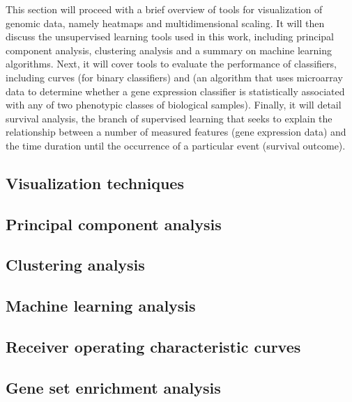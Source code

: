
\medskip

This section will proceed with a brief overview of tools for visualization of
genomic data, namely heatmaps and multidimensional scaling.  It will then
discuss the unsupervised learning tools used in this work, including principal
component analysis, clustering analysis and a summary on machine learning
algorithms.  Next, it will cover tools to evaluate the performance of
classifiers, including  curves (for binary classifiers) and
 (an algorithm that uses microarray data to determine whether a
gene expression classifier is statistically associated with any of two
phenotypic classes of biological samples).  Finally, it will detail survival
analysis, the branch of supervised learning that seeks to explain the
relationship between a number of measured features (gene expression data) and
the time duration until the occurrence of a particular event (survival outcome).

\subsection{Visualization techniques}
\label{sec:methods-visualization}

\subsection{Principal component analysis}
\label{sec:methods-pc}

\subsection{Clustering analysis}
\label{sec:methods-clustering}

\subsection{Machine learning analysis}
\label{sec:methods-machine-learning}

\subsection{Receiver operating characteristic curves}
\label{sec:methods-roc}

\subsection{Gene set enrichment analysis}
\label{sec:methods-gsea}

